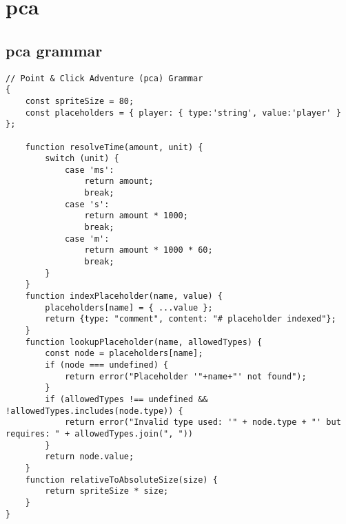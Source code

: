 \chapter{pca}
\section{pca grammar}
\begin{lstlisting}[language=PEG, label={app:pca:grammar1}, caption={The pca Language Grammar}]
// Point & Click Adventure (pca) Grammar
{
	const spriteSize = 80;
    const placeholders = { player: { type:'string', value:'player' } };

	function resolveTime(amount, unit) {
    	switch (unit) {
        	case 'ms':
            	return amount;
                break;
        	case 's':
            	return amount * 1000;
                break;
        	case 'm':
            	return amount * 1000 * 60;
                break;
        }
    }
    function indexPlaceholder(name, value) {
    	placeholders[name] = { ...value };
        return {type: "comment", content: "# placeholder indexed"};
    }
    function lookupPlaceholder(name, allowedTypes) {
    	const node = placeholders[name];
        if (node === undefined) {
        	return error("Placeholder '"+name+"' not found");
        }
        if (allowedTypes !== undefined && !allowedTypes.includes(node.type)) {
        	return error("Invalid type used: '" + node.type + "' but requires: " + allowedTypes.join(", "))
        }
        return node.value;
    }
    function relativeToAbsoluteSize(size) {
    	return spriteSize * size;
    }
}
\end{lstlisting}
\newpage

